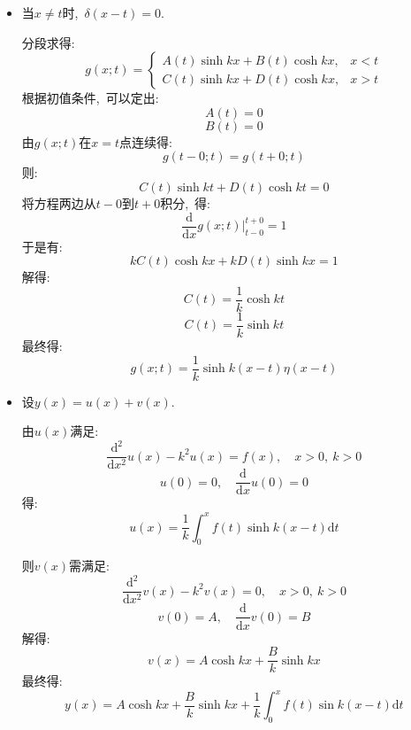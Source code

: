 \documentclass[a4paper,fontset=windows]{ctexart}
\begin{document}
\begin{itemize}

\item[2.(1)]
当$x\neq t$时,\ $\delta(x-t)=0$.

分段求得:
\begin{equation}
g(x;t)=\left\{
\begin{array}{lr}
A(t)\sinh kx+B(t)\cosh kx, &x<t \\
C(t)\sinh kx+D(t)\cosh kx, &x>t 
\end{array}
\right.
\end{equation}
根据初值条件,\ 可以定出:
\[
A(t)
=0
\]
\[
B(t)
=0
\]
由$g(x;t)$在$x=t$点连续得:
\[
g(t-0;t)
=g(t+0;t)
\]
则:
\[
C(t)\sinh kt+D(t)\cosh kt
=0
\]
将方程两边从$t-0$到$t+0$积分,\ 得:
\[
\frac{\mathrm{d}}{\mathrm{d}x}g(x;t)\bigg|_{t-0}^{t+0}
=1
\]
于是有:
\[
kC(t)\cosh kx+kD(t)\sinh kx
=1
\]
解得:
\[
C(t)
=\frac{1}{k}\cosh kt
\]
\[
C(t)
=\frac{1}{k}\sinh kt
\]
最终得:
\[
g(x;t)
=\frac{1}{k}\sinh k(x-t)\eta(x-t)
\]

\bigskip
\item[3.(2)]
设$y(x)=u(x)+v(x)$.

由$u(x)$满足:
\[
\frac{\mathrm{d}^2}{\mathrm{d}x^2}u(x)-k^2u(x)
=f(x),\quad x>0,\ k>0
\]
\[
u(0)=0,\quad\frac{\mathrm{d}}{\mathrm{d}x}u(0)=0
\]
得:
\[
u(x)
=\frac{1}{k}\int_{0}^{x}f(t)\sinh k(x-t)\mathrm{d}t
\]

则$v(x)$需满足:
\[
\frac{\mathrm{d}^2}{\mathrm{d}x^2}v(x)-k^2v(x)
=0,\quad x>0,\ k>0
\]
\[
v(0)=A,\quad\frac{\mathrm{d}}{\mathrm{d}x}v(0)=B
\]
解得:
\[
v(x)
=A\cosh kx+\frac{B}{k}\sinh kx
\]
最终得:
\[
y(x)
=A\cosh kx+\frac{B}{k}\sinh kx+\frac{1}{k}\int_{0}^{x}f(t)\sin k(x-t)\mathrm{d}t
\]
\end{itemize}
\end{document}

